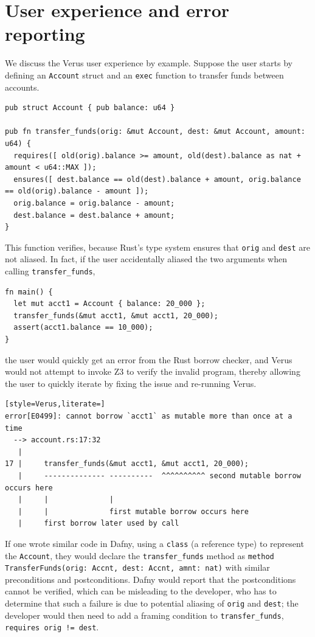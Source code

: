 \section{User experience and error reporting} \label{sec:user-experience}

We discuss the Verus user experience by example. Suppose the user starts by defining an \verb`Account` struct and
an \verb`exec` function to transfer funds between accounts.

\begin{lstlisting}[language=Verus,style=VerusLineNos,firstnumber=6]
pub struct Account { pub balance: u64 }

pub fn transfer_funds(orig: &mut Account, dest: &mut Account, amount: u64) {
  requires([ old(orig).balance >= amount, old(dest).balance as nat + amount < u64::MAX ]);
  ensures([ dest.balance == old(dest).balance + amount, orig.balance == old(orig).balance - amount ]);
  orig.balance = orig.balance - amount;
  dest.balance = dest.balance + amount;
}
\end{lstlisting}

This function verifies, because Rust's type system ensures that \verb`orig` and \verb`dest`
are not aliased. In fact, if the user accidentally aliased the two arguments when calling \verb`transfer_funds`,
\begin{lstlisting}[language=Verus,style=VerusLineNos,firstnumber=15]
fn main() {
  let mut acct1 = Account { balance: 20_000 };
  transfer_funds(&mut acct1, &mut acct1, 20_000);
  assert(acct1.balance == 10_000);
}
\end{lstlisting}
\noindent the user would quickly get an error from the Rust borrow checker, and Verus would not
attempt to invoke Z3 to verify the invalid program, thereby allowing the user to quickly iterate by fixing
the issue and re-running Verus.
\begin{lstlisting}[style=Verus,literate=]
error[E0499]: cannot borrow `acct1` as mutable more than once at a time
  --> account.rs:17:32
   |
17 |     transfer_funds(&mut acct1, &mut acct1, 20_000);
   |     -------------- ----------  ^^^^^^^^^^ second mutable borrow occurs here
   |     |              |
   |     |              first mutable borrow occurs here
   |     first borrow later used by call
\end{lstlisting}

If one wrote similar code in Dafny, using a \verb`class` (a reference type) to
represent the \verb`Account`, they would declare the \verb`transfer_funds` method as
\lstinline[style=Verus]|method TransferFunds(orig: Accnt, dest: Accnt, amnt: nat)| with
similar preconditions and postconditions. Dafny would report that the postconditions
cannot be verified, which can be misleading to the developer, who has to determine that such
a failure is due to potential aliasing of \verb`orig` and \verb`dest`; the developer
would then need to add a framing condition to \verb`transfer_funds`,
\verb`requires orig != dest`.


